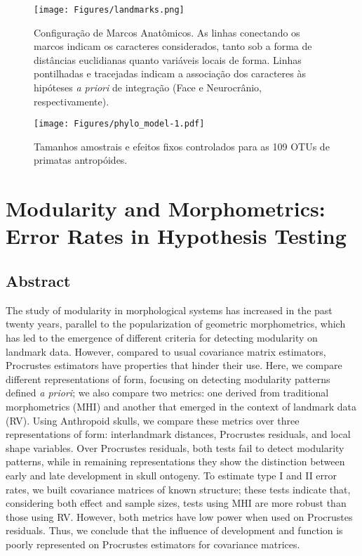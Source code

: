 \documentclass[12pt,twoside]{report}
\begin{document}


\begin{figure}[htbp]
\centering
\texttt{[image: Figures/landmarks.png]}
\caption{Configuração de Marcos Anatômicos. As linhas conectando os
marcos indicam os caracteres considerados, tanto sob a forma de
distâncias euclidianas quanto variáveis locais de forma. Linhas
pontilhadas e tracejadas indicam a associação dos caracteres às
hipóteses \emph{a priori} de integração (Face e Neurocrânio,
respectivamente). \label{fig:landmarks}}
\end{figure}



\begin{figure}[htbp]
\centering
\texttt{[image: Figures/phylo\_model-1.pdf]}
\caption{Tamanhos amostrais e efeitos fixos controlados para as 109 OTUs
de primatas antropóides. \label{fig:phylo_model}}
\end{figure}

\def\sectionautorefname{Section} \def\chapterautorefname{Chapter}
\def\figureautorefname{Figure} \def\tableautorefname{Table}


\newpage
\chapter{Modularity and Morphometrics: Error Rates in Hypothesis Testing}
\label{ch:modcomp}

\section{Abstract}\label{abstract}

The study of modularity in morphological systems has increased in the
past twenty years, parallel to the popularization of geometric
morphometrics, which has led to the emergence of different criteria for
detecting modularity on landmark data. However, compared to usual
covariance matrix estimators, Procrustes estimators have properties that
hinder their use. Here, we compare different representations of form,
focusing on detecting modularity patterns defined \emph{a priori}; we
also compare two metrics: one derived from traditional morphometrics
(MHI) and another that emerged in the context of landmark data (RV).
Using Anthropoid skulls, we compare these metrics over three
representations of form: interlandmark distances, Procrustes residuals,
and local shape variables. Over Procrustes residuals, both tests fail to
detect modularity patterns, while in remaining representations they show
the distinction between early and late development in skull ontogeny. To
estimate type I and II error rates, we built covariance matrices of
known structure; these tests indicate that, considering both effect and
sample sizes, tests using MHI are more robust than those using RV.
However, both metrics have low power when used on Procrustes residuals.
Thus, we conclude that the influence of development and function is
poorly represented on Procrustes estimators for covariance matrices.
\end{document}
